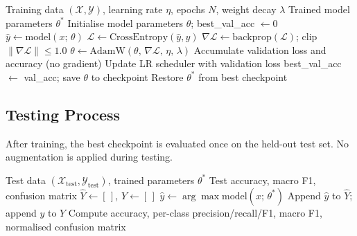 \documentclass[12pt, letterpaper]{article}
\begin{document}
\begin{algorithm}[h!]
\caption{General Training Procedure}
\label{alg:train}
\begin{algorithmic}[1]
\Require Training data $(\mathcal{X}, \mathcal{Y})$, learning rate $\eta$,
         epochs $N$, weight decay $\lambda$
\Ensure Trained model parameters $\theta^*$
\State Initialise model parameters $\theta$; best\_val\_acc $\leftarrow 0$
        \State $\hat{y} \leftarrow \text{model}(x;\, \theta)$
        \State $\mathcal{L} \leftarrow \text{CrossEntropy}(\hat{y}, y)$
        \State $\nabla\mathcal{L} \leftarrow \text{backprop}(\mathcal{L})$;
               clip $\|\nabla\mathcal{L}\| \leq 1.0$
        \State $\theta \leftarrow \text{AdamW}(\theta,\, \nabla\mathcal{L},\,
               \eta,\, \lambda)$
    \EndFor
        \State Accumulate validation loss and accuracy (no gradient)
    \EndFor
    \State Update LR scheduler with validation loss
        \State best\_val\_acc $\leftarrow$ val\_acc; save $\theta$ to checkpoint
    \EndIf
\EndFor
\State Restore $\theta^*$ from best checkpoint
\end{algorithmic}
\end{algorithm}

\subsection{Testing Process}

After training, the best checkpoint is evaluated once on the held-out test set.
No augmentation is applied during testing.

\begin{algorithm}[h!]
\caption{Testing Procedure}
\label{alg:test}
\begin{algorithmic}[1]
\Require Test data $(\mathcal{X}_{\text{test}}, \mathcal{Y}_{\text{test}})$,
         trained parameters $\theta^*$
\Ensure Test accuracy, macro F1, confusion matrix
\State $\hat{Y} \leftarrow [\,]$, $Y \leftarrow [\,]$
    \State $\hat{y} \leftarrow \arg\max \text{model}(x;\, \theta^*)$
    \State Append $\hat{y}$ to $\hat{Y}$; append $y$ to $Y$
\EndFor
\State Compute accuracy, per-class precision/recall/F1, macro F1,
       normalised confusion matrix
\end{algorithmic}
\end{algorithm}
\end{document}
